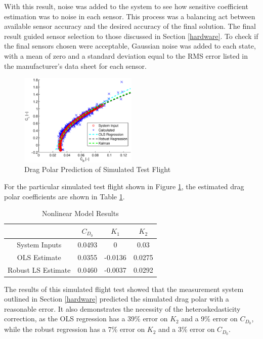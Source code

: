With this result, noise was added to the system to see how sensitive coefficient estimation was to noise in each sensor. This process was a balancing act between available sensor accuracy and the desired accuracy of the final solution. The final result guided sensor selection to those discussed in Section \ref{hardware}. To check if the final sensors chosen were acceptable, Gaussian noise was added to each state, with a mean of zero and a standard deviation equal to the RMS error listed in the manufacturer's data sheet for each sensor.
\begin{figure}[H]

  \centering
    \includegraphics[width=0.5\textwidth]{figures/simDragPolarNoise.eps}
      \caption{Drag Polar Prediction of Simulated Test Flight} \label{dragPolarNoise}
\end{figure}

For the particular simulated test flight shown in Figure \ref{dragPolarNoise}, the estimated drag polar coefficients are shown in Table \ref{simCoeffErrorTable}.

\begin{table}[ht]
\caption{Nonlinear Model Results} %
\centering %
\begin{tabular}{c c c c} %
\hline\hline %
 & $C_{D_0}$ & $K_1$ & $K_2$ \\ [0.5ex] %
\hline %
System Inputs & 0.0493 & 0 & 0.03 \\ %
OLS Estimate & 0.0355 & -0.0136 & 0.0275 \\
Robust LS Estimate & 0.0460 & -0.0037 & 0.0292 \\ [1ex] %
\hline %
\end{tabular}
\label{simCoeffErrorTable} %
\end{table}
The results of this simulated flight test showed that the measurement system outlined in Section \ref{hardware} predicted the simulated drag polar with a reasonable error. It also demonstrates
 the necessity of the heteroskedasticity correction, as the OLS regression has a 39\% error on $K_2$ and a 9\% error on $C_{D_0}$, while the robust regression has a 7\% error on $K_2$ and a 3\% error on $C_{D_0}$.